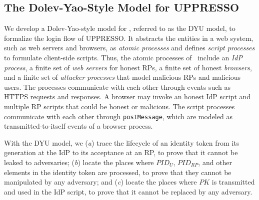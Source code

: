 

\subsection{The Dolev-Yao-Style Model for UPPRESSO}
\label{dy-model}
We develop a Dolev-Yao-style model \cite{SPRESSO} for \usso, referred to as the DYU model, to formalize the login flow of UPPRESSO. %
It abstracts the entities in a web system, such as web servers and browsers, as \emph{atomic processes} %
and defines \emph{script processes} to formulate client-side scripts.
Thus, the atomic processes of \usso~include an {\em IdP process}, a finite set of {\em web servers} for honest RPs, a finite set of honest {\em browsers}, and a finite set of {\em attacker processes} that model malicious RPs and malicious users. The processes communicate with each other through events such as HTTPS requests and responses.
A browser may invoke an honest IdP script and multiple RP scripts that could be honest or malicious.
The script processes communicate with each other through \verb+postMessage+, which are modeled as transmitted-to-itself events of a browser process.

\newc
With the DYU model, we (\emph{a}) trace the lifecycle of an identity token from its generation at the IdP to its acceptance at an RP, to prove that it cannot be leaked to adversaries;
(\emph{b}) locate the places where $PID_U$, $PID_{RP}$, and other elements in the identity token are processed,
 to prove that they cannot be manipulated by any adversary; and (\emph{c}) locate the places
  where $PK$ is transmitted and used in the IdP script,
to prove that it cannot be replaced by any adversary.

